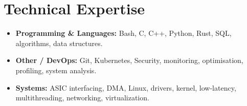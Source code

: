 \documentclass[9pt,a4paper]{article}
\begin{document}
\section*{Technical Expertise}
\begin{tcolorbox}[mybox]
\begin{itemize}
\item \textbf{Programming \& Languages:} Bash, C, C++, Python, Rust, SQL, algorithms, data structures.

\item \textbf{Other / DevOps:} Git, Kubernetes, Security, monitoring, optimisation, profiling, system analysis.

\item \textbf{Systems:} ASIC interfacing, DMA, Linux, drivers, kernel, low-latency, multithreading, networking, virtualization.
\end{itemize}
\end{tcolorbox}
\end{document}

